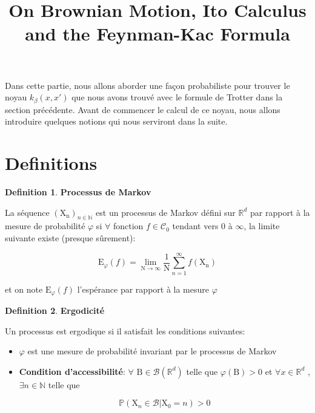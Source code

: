 \documentclass[11pt]{article}
\title{On Brownian Motion, Ito Calculus and the Feynman-Kac Formula}
\theoremstyle{definition}
\newtheorem{definition}{Definition}[section]
\theoremstyle{remark}
\begin{document}
 
\maketitle 

Dans cette partie, nous allons aborder une façon probabiliste pour trouver le noyau $k_{\beta}(x, x')$ que nous avons trouvé avec le formule de Trotter dans la section précédente. Avant de commencer le calcul de ce noyau, nous allons introduire quelques notions qui nous serviront dans la suite. 

\section{Definitions}

\theoremstyle{definition}

\begin{definition}{\textbf{Processus de Markov}}

La séquence $(\mathrm{X_n})_{n \in \mathbb{N}}$ est un processus de Markov défini sur $\mathbb{R} ^ {d}$ par rapport à la mesure de probabilité $\varphi$ si $\forall$ fonction $f \in \mathcal{C}_{0}$ tendant vers 0 à $\infty$, la limite suivante existe (presque sûrement): 

\[ \mathrm{E}_{\varphi}(f) = \lim_{\mathrm{N}\to\infty} \frac{1}{\mathrm{N}} \sum_{n=1}^{\infty} f(\mathrm{X_n}) \]

et on note $\mathrm{E}_{\varphi}(f)$ l’espérance par rapport à la mesure $\varphi$

\end{definition}

\begin{definition}{\textbf{Ergodicité}}

Un processus est ergodique si il satisfait les conditions suivantes:

\begin{itemize}

\item 

$\varphi$ est une mesure de probabilité invariant par le processus de Markov 

\item 

\textbf{Condition d'accessibilité}: $\forall$ $\mathrm{B} \in \mathcal{B}(\mathbb{R}^d)$ telle que $\varphi(\mathrm{B}) > 0$ et $\forall x \in \mathbb{R}^d$ , $\exists n \in \mathbb{N}$ telle que

\[ \mathbb{P}(\mathrm{X}_n \in \mathcal{B} | \mathrm{X}_0 =n ) > 0\]

\end{itemize}

\end{definition}
\end{document}
